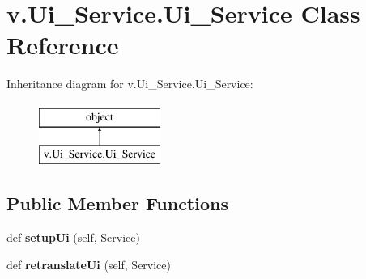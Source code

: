 \hypertarget{classv_1_1_ui___service_1_1_ui___service}{}\section{v.\+Ui\+\_\+\+Service.\+Ui\+\_\+\+Service Class Reference}
\label{classv_1_1_ui___service_1_1_ui___service}
Inheritance diagram for v.\+Ui\+\_\+\+Service.\+Ui\+\_\+\+Service\+:\begin{figure}[H]
\begin{center}
\leavevmode
\includegraphics[height=2.000000cm]{classv_1_1_ui___service_1_1_ui___service}
\end{center}
\end{figure}
\subsection*{Public Member Functions}
\begin{DoxyCompactItemize}
\item 
\hypertarget{classv_1_1_ui___service_1_1_ui___service_aa5c20b6064a392f1ed1d79812b9f54c4}{}def {\bfseries setup\+Ui} (self, Service)\label{classv_1_1_ui___service_1_1_ui___service_aa5c20b6064a392f1ed1d79812b9f54c4}

\item 
\hypertarget{classv_1_1_ui___service_1_1_ui___service_a1388958761966fb2fcc62ec145308115}{}def {\bfseries retranslate\+Ui} (self, Service)\label{classv_1_1_ui___service_1_1_ui___service_a1388958761966fb2fcc62ec145308115}

\end{DoxyCompactItemize}
